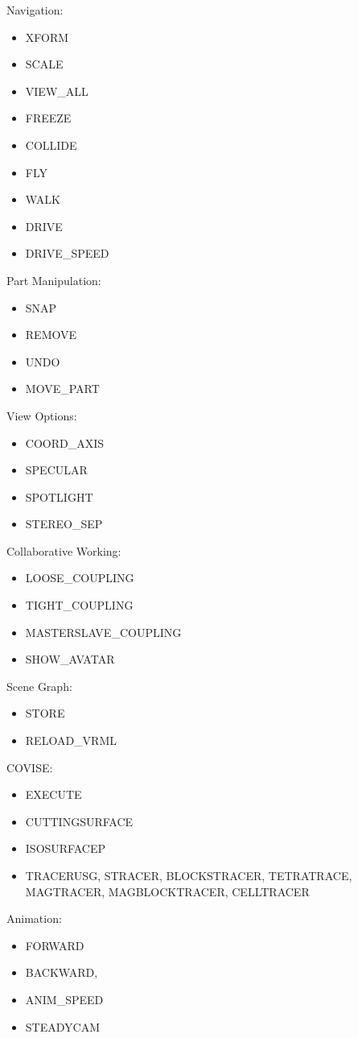 Navigation: 
\begin{itemize}
\item XFORM
\item SCALE
\item VIEW\_ALL
\item FREEZE
\item COLLIDE
\item FLY
\item WALK
\item DRIVE
\item DRIVE\_SPEED
\end{itemize}

Part Manipulation: 
\begin{itemize}
\item SNAP
\item REMOVE
\item UNDO
\item MOVE\_PART
\end{itemize}

View Options: 
\begin{itemize}
\item COORD\_AXIS
\item SPECULAR
\item SPOTLIGHT
\item STEREO\_SEP
\end{itemize}

Collaborative Working: 
\begin{itemize}
\item LOOSE\_COUPLING
\item TIGHT\_COUPLING
\item MASTERSLAVE\_COUPLING
\item SHOW\_AVATAR
\end{itemize}

Scene Graph: 
\begin{itemize}
\item STORE
\item RELOAD\_VRML
\end{itemize}

COVISE: 
\begin{itemize}
\item EXECUTE
\item CUTTINGSURFACE
\item ISOSURFACEP
\item TRACERUSG, STRACER, BLOCKSTRACER, TETRATRACE, MAGTRACER, MAGBLOCKTRACER, 
CELLTRACER
\end{itemize}

Animation: 
\begin{itemize}
\item FORWARD
\item BACKWARD,
\item ANIM\_SPEED
\item STEADYCAM
\end{itemize}



